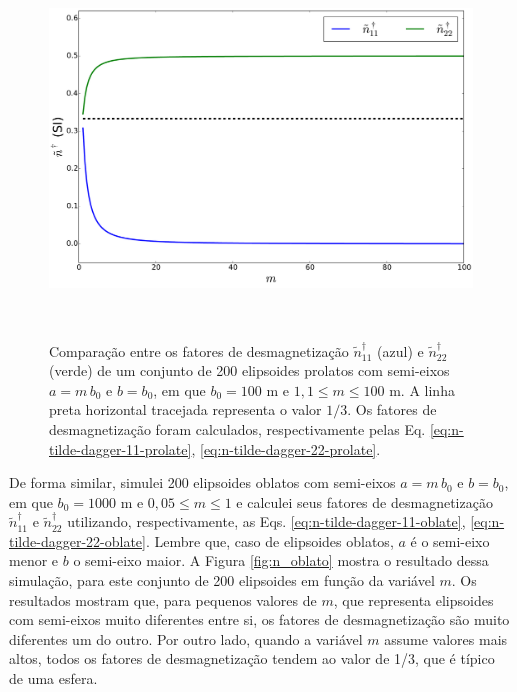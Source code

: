 \begin{figure}[hbt!]
	\centering \includegraphics[width=15cm,height=10cm]{figures/test_n_prolate}
	\caption[Comparação entre os fatores de desmagnetização $\tilde{n}^{\dagger}_{11}$ (azul) e $\tilde{n}^{\dagger}_{22}$ (verde) de um conjunto de 200 elipsoides prolatos com semi-eixos $a=m\, b_0$ e $b=b_0$, em que $b_0=100$ m e $1,1 \le m \le 100$ m. A linha preta horizontal tracejada representa o valor $1/3$. Os fatores de desmagnetização foram calculados, respectivamente pelas Eq. \ref{eq:n-tilde-dagger-11-prolate}, \ref{eq:n-tilde-dagger-22-prolate}.]{Comparação entre os fatores de desmagnetização $\tilde{n}^{\dagger}_{11}$ (azul) e $\tilde{n}^{\dagger}_{22}$ (verde) de um conjunto de 200 elipsoides prolatos com semi-eixos $a=m\, b_0$ e $b=b_0$, em que $b_0=100$ m e $1,1 \le m \le 100$ m. A linha preta horizontal tracejada representa o valor $1/3$. Os fatores de desmagnetização foram calculados, respectivamente pelas Eq. \ref{eq:n-tilde-dagger-11-prolate}, \ref{eq:n-tilde-dagger-22-prolate}.}
	\label{fig:n_prolato}
\end{figure}

De forma similar, simulei 200 elipsoides oblatos com semi-eixos $a=m\, b_0$ e $b=b_0$, em que $b_0=1000$ m e $0,05 \le m \le 1$ e calculei seus fatores de desmagnetização $\tilde{n}^{\dagger}_{11}$ e $\tilde{n}^{\dagger}_{22}$ utilizando, respectivamente, as Eqs. \ref{eq:n-tilde-dagger-11-oblate}, \ref{eq:n-tilde-dagger-22-oblate}. Lembre que, caso de elipsoides oblatos, $a$ é o semi-eixo menor e $b$ o semi-eixo maior. A Figura \ref{fig:n_oblato} mostra o resultado dessa simulação, para este conjunto de 200 elipsoides em função da variável $m$. Os resultados mostram que, para pequenos valores de $m$, que representa elipsoides com semi-eixos muito diferentes entre si, os fatores de desmagnetização são muito diferentes um do outro. Por outro lado, quando a variável $m$ assume valores mais altos, todos os fatores de desmagnetização tendem ao valor de 1/3, que é típico de uma esfera.\\

